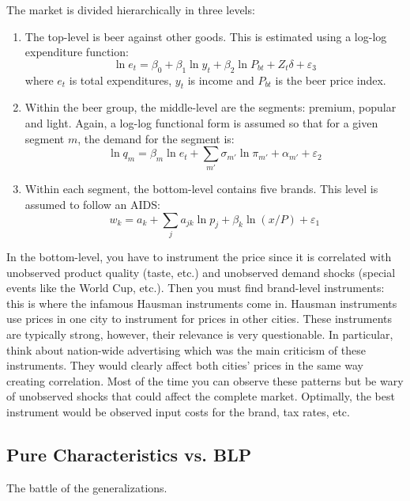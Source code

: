 The market is divided hierarchically in three levels:\begin{enumerate}
\item The top-level is beer against other goods. This is estimated using a log-log expenditure function: $$\ln e_t = \beta_0 + \beta_1 \ln y_t + \beta_2 \ln P_{bt} + Z_t\delta + \varepsilon_3 $$ where $e_t$ is total expenditures, $y_t$ is income and $P_{bt}$ is the beer price index.
\item Within the beer group, the middle-level are the segments: premium, popular and light. Again, a log-log functional form is assumed so that for a given segment $m$, the demand for the segment is: $$\ln q_m = \beta_m \ln e_t + \sum_{m'} \sigma_{m'} \ln \pi_{m'} + \alpha_{m'} + \varepsilon_2 $$
\item Within each segment, the bottom-level contains five brands. This level is assumed to follow an AIDS: $$w_k = a_k + \sum_{j} a_{jk} \ln p_j + \beta_k \ln (x/P) + \varepsilon_1 $$
\end{enumerate}

In the bottom-level, you have to instrument the price since it is correlated with unobserved product quality (taste, etc.) and unobserved demand shocks (special events like the World Cup, etc.). Then you must find brand-level instruments: this is where the infamous Hausman instruments come in. Hausman instruments use prices in one city to instrument for prices in other cities. These instruments are typically strong, however, their relevance is very questionable. In particular, think about nation-wide advertising which was the main criticism of these instruments. They would clearly affect both cities' prices in the same way creating correlation. Most of the time you can observe these patterns but be wary of unobserved shocks that could affect the complete market. Optimally, the best instrument would be observed input costs for the brand, tax rates, etc.

\subsection{Pure Characteristics vs. BLP}

The battle of the generalizations.
